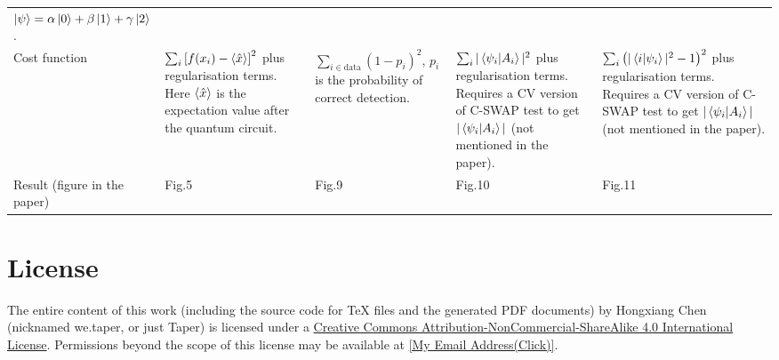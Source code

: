 \documentclass{article}
\begin{document}
\begin{table}[H]
\begin{tabu}{X[0.5]|X|X|X|X}
    $\ket{\psi} = \alpha\ket{0} + \beta\ket{1} +
    \gamma\ket{2}$.
    \\
    Cost function &
    $\sum_i \left[f(x_i) - \braket{\hat{x}} \right]^2$ plus
    regularisation terms. Here $\braket{\hat{x}}$ is the expectation value after
    the quantum circuit.&
    $\sum_{i\in \text{data}} (1-p_i)^2$, $p_i$ is the probability of correct
    detection.&
    $\sum_i |\braket{\psi_i | A_i}|^2$ plus regularisation terms. 
    Requires a CV version of C-SWAP test to get $|\braket{\psi_i |
    A_i}|$ (not mentioned in the paper).
    &
    $\sum_i \left(|\braket{ i| \psi_i }|^2 -1\right)^2$ plus regularisation terms.
    Requires a CV version of C-SWAP test to get $|\braket{\psi_i |
    A_i}|$ (not mentioned in the paper).
    \\
    Result (figure in the paper) &
    Fig.5 & Fig.9 & Fig.10 & Fig.11 
  \end{tabu}
\end{table}

\section{License}
The entire content of this work (including the source code
for TeX files and the generated PDF documents) by 
Hongxiang Chen (nicknamed we.taper, or just Taper) is
licensed under a 
\href{http://creativecommons.org/licenses/by-nc-sa/4.0/}{Creative 
Commons Attribution-NonCommercial-ShareAlike 4.0 International 
License}. Permissions beyond the scope of this 
license may be available at 
\href{http://www.google.com/recaptcha/mailhide/d?k=015LguzBJigi0rpyuJRqLoig==\&c=p1c-M-mm7ZcjUCkTuZZa9eEPHRVk6paN0694iazlQy8=}
{[My Email Address(Click)]}.

{}

\printnomenclature
\end{document}
